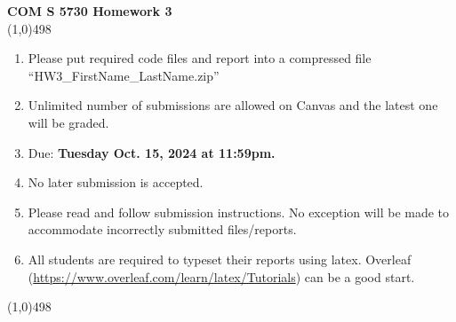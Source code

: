 \documentclass[11pt]{article}
\begin{document}
\begin{center}
{\Large \textbf{COM S 5730 Homework 3}}\\

\linethickness{1mm}\line(1,0){498}

\begin{enumerate}
\item Please put required code files and report into a
compressed file ``HW3\_FirstName\_LastName.zip''
\item Unlimited number of submissions are
allowed on Canvas and the latest one will be graded.
\item Due: \textbf{Tuesday Oct. 15, 2024 at 11:59pm.}
\item {\color{red} No later submission is accepted.}
\item Please read and follow submission instructions. No exception
will be made to accommodate incorrectly submitted files/reports.
\item All students are required to typeset their reports using
latex. Overleaf
(\url{https://www.overleaf.com/learn/latex/Tutorials}) can be a
good start.
\end{enumerate}

\linethickness{1mm}\line(1,0){498}

\end{center}


\end{document}
